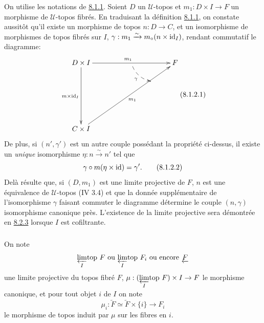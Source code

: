 \documentclass[10pt]{../fichiers-configuration-latex/smfart}
\begin{document}
\setcounter{subsubsection}{1}
\subsubsection{}

On utilise les notations de \hyperref[VI.def8.1.1]{8.1.1}. Soient $D$ un $𝒰$-topos et $m_1 : D
\times I \to F$ un morphisme de $𝒰$-topos fibrés. En traduisant la
définition \hyperref[VI.def8.1.1]{8.1.1}, on constate aussitôt qu'il existe un morphisme de
topos $n : D \to C$, et un isomorphisme de morphismes de topos fibrés
sur $I$, $\gamma : m_{1} \xrightarrow{\sim} m_{\circ} (n \times \operatorname{id}_I)$,
rendant commutatif le diagramme:
\[\vcenter{
\xymatrix@C=.75cm@R=.5cm{
D \times I  \ar[rrrr]^{m_1} \ar[dddd]_{m\times \id_I} &&{\phantom{.}}\ar@/_.5pc/@{-->}[dr]_{\gamma}  &&F\\
                         & &{\phantom{a}}& &\\
                         & && & \\
                         & && & \\
C \times I \ar[rrrruuuu]_{m_1}&& &&{\phantom{a}}\\
}}\leqno{(8.1.2.1)}
\]
De plus, si $(n', \gamma')$ est un autre couple possédant la
propriété ci-dessus, il existe un \emph{unique} isomorphisme $\eta : n
\xrightarrow{\sim} n'$ tel que
\begin{equation*}
\gamma \circ m (\eta \times \operatorname{id}) = \gamma'{}.\tag{8.1.2.2}
\end{equation*}
De\pageoriginale là résulte que, si $(D, m_1)$ est une limite
projective de $F$, $n$ est une équivalence de $𝒰$-topos
(IV 3.4) et que la donnée
supplémentaire de l'isomorphisme $\gamma$ faisant commuter le
diagramme  détermine le couple $(n, \gamma)$
isomorphisme
canonique près. L'existence de la limite projective sera
démontrée en
\hyperref[VI.thm8.2.3]{8.2.3} lorsque $I$ est cofiltrante.

\subsubsection{}
On note
$$
{\displaystyle{\varprojlim_{I}\!\mbox{\rm top }}} F \mbox{ ou } {\displaystyle{\varprojlim_{I}\!\mbox{\rm top }}}
F_i \mbox{ ou encore } \underleftarrow{F}
$$
une limite projective du topos fibré $F$, $\mu :
(\limtop{I} F) \times I \to F$ le
morphisme canonique, et pour tout objet $i$ de $I$ on note
$$
\mu_i : \underleftarrow{F} \simeq \underleftarrow{F} \times \{i\} \to F_{i}
$$
le morphisme de topos induit par $\mu$ sur les fibres en $i$.
\end{document}
